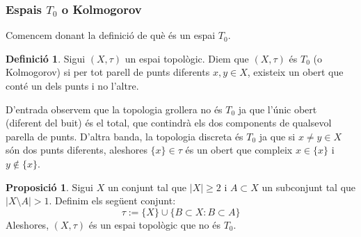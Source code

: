 \documentclass[10pt,a4paper]{article}
\theoremstyle{definition}
\newtheorem{definition}[theorem]{Definició}
\newtheorem{prop}[theorem]{Proposició}
\begin{document}
\subsubsection*{Espais $T_0$ o Kolmogorov}
Comencem donant la definició de què és un espai $T_0$.
\begin{definition}
      Sigui $(X,\tau)$ un espai topològic. Diem que $(X,\tau)$ és $T_0$ (o Kolmogorov) si per tot parell de punts diferents $x,y\in X$, existeix un obert que conté un dels punts i no l'altre.
\end{definition}
D'entrada observem que la topologia grollera no és $T_0$ ja que l'únic obert (diferent del buit) és el total, que contindrà els dos components de qualsevol parella de punts. D'altra banda, la topologia discreta és $T_0$ ja que si $x\ne y\in X$ són dos punts diferents, aleshores $\{x\}\in\tau$ és un obert que compleix $x\in\{x\}$ i $y\notin\{x\}$.
\begin{prop}
      Sigui $X$ un conjunt tal que $|X|\geq 2$ i $A\subset X$ un subconjunt tal que $|X\setminus A|>1$. Definim els següent conjunt: $$\tau:=\{X\}\cup\{B\subset X:B\subset A\}$$
      Aleshores, $(X,\tau)$ és un espai topològic que no és $T_0$.
\end{prop}
\end{document}
